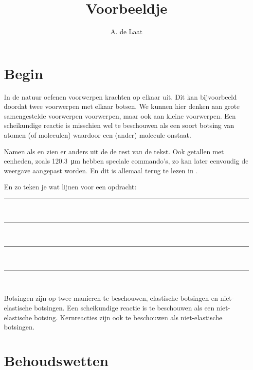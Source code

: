 

\title{Voorbeeldje}
\author{A. de Laat}



\maketitle

\section{Begin}

In de natuur oefenen voorwerpen krachten op elkaar uit. Dit kan bijvoorbeeld
doordat twee voorwerpen met elkaar botsen. We kunnen hier denken aan
grote samengestelde voorwerpen voorwerpen, maar ook aan kleine voorwerpen.
Een scheikundige reactie is misschien wel te beschouwen als een soort
botsing van atomen (of moleculen) waardoor een (ander) molecule onstaat.

Namen als \hisparc en \jsparc zien er anders uit de de rest van de tekst.
Ook getallen met eenheden, zoals \SI{120.3}{\micro\meter} hebben speciale
commando's, zo kan later eenvoudig de weergave aangepast worden. En dit
is allemaal terug te lezen in \cite{tekst}.

En zo teken je wat lijnen voor een opdracht:

\begin{center}
    \rule{\textwidth}{0.3mm}\\
    \rule{\textwidth}{0.3mm}\\
    \rule{\textwidth}{0.3mm}\\
    \rule{\textwidth}{0.3mm}\\
\end{center}

Botsingen zijn op twee manieren te beschouwen, elastische botsingen
en niet-elastische botsingen. Een scheikundige reactie is te beschouwen
als een niet-elastische botsing. Kernreacties zijn ook te beschouwen
als niet-elastische botsingen.


\section{Behoudswetten}

